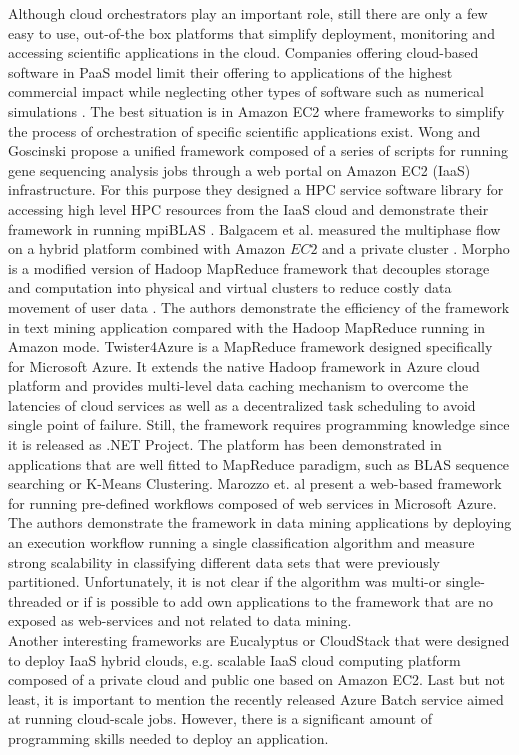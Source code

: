 \documentclass[3p,times]{elsarticle}
\begin{document}
Although cloud orchestrators play an important role, still there are only a few easy to use, out-of-the box platforms that simplify deployment, monitoring and accessing scientific applications in the cloud. Companies offering cloud-based software in PaaS model limit their offering to applications of the highest commercial impact while neglecting other types of software such as numerical simulations \cite{CloudStack} \cite{OpenStack}. The best situation is in Amazon EC2 where frameworks to simplify the process of orchestration of specific scientific applications exist. Wong and Goscinski propose a unified framework composed of a series of scripts for running gene sequencing analysis jobs through a web portal \cite{Wong2013} on Amazon EC2 (IaaS) infrastructure. For this purpose they designed a HPC service software library for accessing high level HPC resources from the IaaS cloud and demonstrate their framework in running mpiBLAS \cite{mpiBlas}. Balgacem et al. measured the multiphase flow on a hybrid platform combined with Amazon $EC2$ and a private cluster \cite{BenBelgacem2015}. Morpho is a modified version of Hadoop MapReduce framework that decouples storage and computation into physical and virtual clusters to reduce costly data movement of user data \cite{Lu2014}. The authors demonstrate the efficiency of the  framework in text mining application compared with the Hadoop MapReduce running in Amazon mode. Twister4Azure is a MapReduce framework designed specifically for Microsoft Azure. It extends the native Hadoop framework in Azure cloud platform and provides multi-level data caching mechanism to overcome the latencies of cloud services as well as a decentralized task scheduling to avoid single point of failure. Still, the framework requires programming knowledge since it is released as .NET Project. The platform has been demonstrated in applications that are well fitted to MapReduce paradigm, such as BLAS sequence searching or K-Means Clustering. Marozzo et. al \cite{catlett2013cloud} present a web-based framework for running pre-defined workflows composed of web services in Microsoft Azure. The authors demonstrate the framework in data mining applications by deploying an execution workflow running a single classification algorithm and measure strong scalability in classifying different data sets that were previously partitioned. Unfortunately, it is not clear if the algorithm was multi-or single-threaded or if is possible to add own applications to the framework that are no exposed as web-services and not related to data mining. \\
Another interesting frameworks are Eucalyptus \cite{eucalyptus} or CloudStack \cite{CloudStack} that were designed to deploy IaaS hybrid clouds, e.g. scalable IaaS cloud computing platform composed of a private cloud and public one based on Amazon EC2. Last but not least, it is important to mention the recently released Azure Batch service aimed at running cloud-scale jobs. However, there is a significant amount of programming skills needed to deploy an application.
\end{document}
